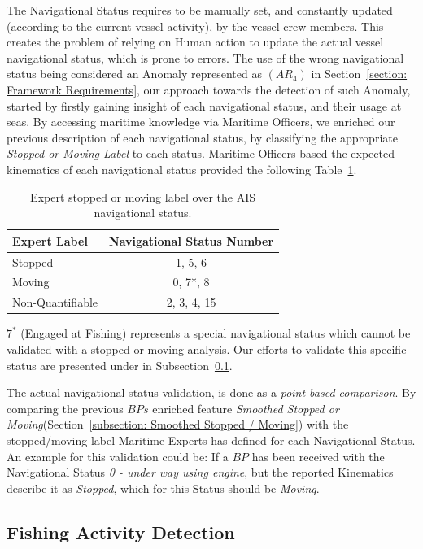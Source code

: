 The Navigational Status requires to be manually set, and constantly updated (according to the current vessel activity), by the vessel crew members.
This creates the problem of relying on Human action to update the actual vessel navigational status, which is prone to errors. 
The use of the wrong navigational status being considered an Anomaly represented as $(AR_4)$ in Section~\ref{section: Framework Requirements}, our approach towards the detection of such Anomaly, started by firstly gaining insight of each navigational status, and their usage at seas.
By accessing maritime knowledge via Maritime Officers, we enriched our previous description of each navigational status, by classifying the appropriate \emph{Stopped or Moving Label} to each status. Maritime Officers based the expected kinematics of each navigational status provided the following Table~\ref{Table: AIS Status Moving or Stopped}.
\begin{table}[H]
\centering
\caption{Expert stopped or moving label over the AIS navigational status.}
\label{Table: AIS Status Moving or Stopped}
\begin{tabular}{lc}
\hline
Expert Label     & Navigational Status Number \\ \hline
Stopped          & 1, 5, 6                    \\
Moving           & 0, 7*, 8                   \\
Non-Quantifiable & 2, 3, 4, 15                \\ \hline
\end{tabular}
\end{table}
$7^*$ (Engaged at Fishing) represents a special navigational status which cannot be validated with a stopped or moving analysis. Our efforts to validate this specific status are presented under in Subsection~\ref{subsection: Fishing Activity Detection}.

The actual navigational status validation, is done as a \emph{point based comparison}. By comparing the previous $BPs$ enriched feature \emph{Smoothed Stopped or Moving}(Section~\ref{subsection: Smoothed Stopped / Moving}) with the stopped/moving label Maritime Experts has defined for each Navigational Status.
An example for this validation could be:
If a $BP$ has been received with the Navigational Status \textit{0 - under way using engine}, but the reported Kinematics describe it as \textit{Stopped}, which for this Status should be \textit{Moving}.

\subsection{Fishing Activity Detection}
\label{subsection: Fishing Activity Detection}

